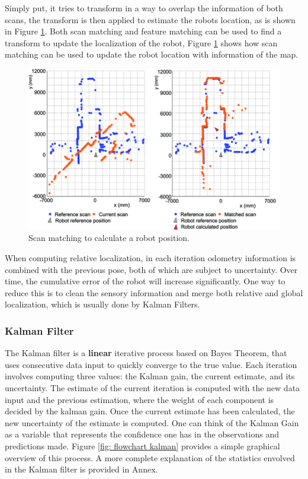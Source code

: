 Simply put, it tries to transform in a way to overlap the information of both scans, the transform is then applied to estimate the robots location, as is shown in Figure \ref*{fig: scan mathing algorithm}. Both scan matching and feature matching can be used to find a transform to update the localization of the robot, Figure \ref*{fig: scan mathing algorithm} shows how scan matching can be used to update the robot location with information of the map.

\begin{figure}[H]
    \centering
    \includegraphics[width=0.7\linewidth]{images/background/Scan-matching-problem-definition-a-Scans-before-alignment-b-Scans-after-alignment.png}
    \caption{Scan matching to calculate a robot position. \cite{konecny_scan_2019}}
    \label{fig: scan mathing algorithm}
\end{figure}

When computing relative localization, in each iteration odometry information is combined with the previous pose, both of which are subject to uncertainty. Over time, the cumulative error of the robot will increase significantly. One way to reduce this is to clean the sensory information and merge both relative and global localization, which is usually done by Kalman Filters.

\subsubsection{Kalman Filter}
The Kalman filter is a \textbf{linear} iterative process based on Bayes Theorem, that uses consecutive data input to quickly converge to the true value. Each iteration involves computing three values: the Kalman gain, the current estimate, and its uncertainty. The estimate of the current iteration is computed with the new data input and the previous estimation, where the weight of each component is decided by the kalman gain. Once the current estimate has been calculated, the new uncertainty of the estimate is computed. One can think of the Kalman Gain as a variable that represents the confidence one has in the observations and predictions made. Figure \ref*{fig: flowchart kalman} provides a simple graphical overview of this process. A more complete explanation of the statistics envolved in the Kalman filter is provided in Annex. 

